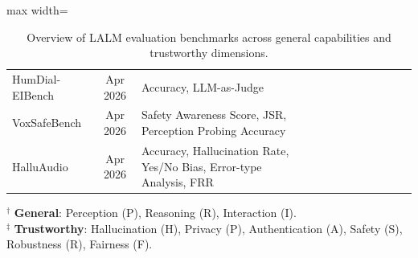 \documentclass{llmxive}
\providecommand{\cmark}{\ding{51}}
\providecommand{\xmark}{\ding{55}}
\begin{document}
\begin{table}[htbp]
\begin{adjustbox}{max width=\textwidth}
\begin{tabular}{@{}lclccccccccc@{}}
HumDial-EIBench\cite{wang2026humdialeibenchhumanrecordedmultiturnemotional}               & Apr 2026 & Accuracy, LLM-as-Judge & \xmark & \cmark & \cmark & \xmark & \xmark & \xmark & \xmark & \cmark & \xmark \\
VoxSafeBench\cite{wang2026voxsafebench}               & Apr 2026 & Safety Awareness Score, JSR, Perception Probing Accuracy & \cmark & \xmark & \cmark & \xmark & \cmark & \xmark & \cmark & \xmark & \cmark \\
HalluAudio\cite{zhao2026halluaudiocomprehensivebenchmarkhallucination} 
& Apr 2026 
& Accuracy, Hallucination Rate, Yes/No Bias, Error-type Analysis, FRR 
& \cmark & \cmark & \xmark 
& \cmark & \xmark & \xmark & \xmark & \cmark & \xmark \\
\bottomrule
\end{tabular}
\end{adjustbox}
\vspace{0.8ex}
\parbox{\textwidth}{%
\scriptsize
$^\dagger$ \textbf{General}: Perception (P), Reasoning (R), Interaction (I). \\
$^\ddagger$ \textbf{Trustworthy}: Hallucination (H), Privacy (P), Authentication (A), Safety (S), Robustness (R), Fairness (F).
}
\caption{Overview of LALM evaluation benchmarks across general capabilities and trustworthy dimensions.}
\label{tab:audiollm_eval_summary}
\end{table}





\end{document}
